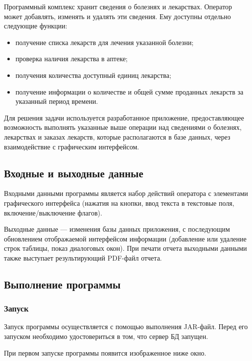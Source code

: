 Программный комплекс хранит сведения о болезнях и лекарствах. Оператор может
добавлять, изменять и удалять эти сведения. Ему доступны отдельно следующие
функции:
\begin{itemize}
    \item получение списка лекарств для лечения указанной болезни;
    \item проверка наличия лекарства в аптеке;
    \item получения количества доступный единиц лекарства;
    \item получение информации о количестве и общей сумме проданных лекарств за
        указанный период времени.
\end{itemize}

Для решения задачи используется разработанное приложение, предоставляющее
возможность выполнять указанные выше операции над сведениями о болезнях,
лекарствах и заказах лекарств, которые располагаются в базе данных, через
взаимодействие с графическим интерфейсом.

\subsection{Входные и выходные данные}

Входными данными программы является набор действий оператора с элементами
графического интерфейса (нажатия на кнопки, ввод текста в текстовые поля,
включение/выключение флагов).

Выходные данные --- изменения базы данных приложения, с последующим обновлением
отображаемой интерфейсом информации (добавление или удаление строк таблицы,
показ диалоговых окон). При печати отчета выходными данными также выступает
результирующий PDF-файл отчета.

\subsection{Выполнение программы}

\subsubsection{Запуск}

Запуск программы осуществляется с помощью выполнения JAR-файл. Перед его
запуском необходимо удостовериться в том, что сервер БД запущен.

При первом запуске программы появится изображенное ниже окно.


